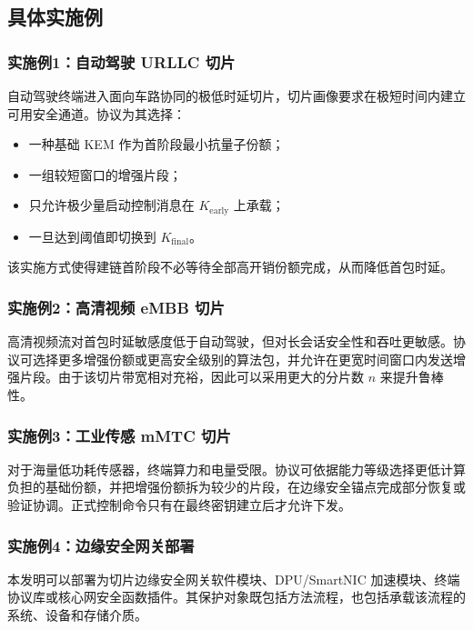 \documentclass[12pt,a4paper]{article}
\newcommand{\Kearly}{K_{\mathrm{early}}}
\newcommand{\Kfinal}{K_{\mathrm{final}}}
\begin{document}
\subsection{具体实施例}

\subsubsection*{实施例1：自动驾驶 URLLC 切片}

自动驾驶终端进入面向车路协同的极低时延切片，切片画像要求在极短时间内建立可用安全通道。协议为其选择：

\begin{itemize}[leftmargin=2em]
    \item 一种基础 KEM 作为首阶段最小抗量子份额；
    \item 一组较短窗口的增强片段；
    \item 只允许极少量启动控制消息在 $\Kearly$ 上承载；
    \item 一旦达到阈值即切换到 $\Kfinal$。
\end{itemize}

该实施方式使得建链首阶段不必等待全部高开销份额完成，从而降低首包时延。

\subsubsection*{实施例2：高清视频 eMBB 切片}

高清视频流对首包时延敏感度低于自动驾驶，但对长会话安全性和吞吐更敏感。协议可选择更多增强份额或更高安全级别的算法包，并允许在更宽时间窗口内发送增强片段。由于该切片带宽相对充裕，因此可以采用更大的分片数 $n$ 来提升鲁棒性。

\subsubsection*{实施例3：工业传感 mMTC 切片}

对于海量低功耗传感器，终端算力和电量受限。协议可依据能力等级选择更低计算负担的基础份额，并把增强份额拆为较少的片段，在边缘安全锚点完成部分恢复或验证协调。正式控制命令只有在最终密钥建立后才允许下发。

\subsubsection*{实施例4：边缘安全网关部署}

本发明可以部署为切片边缘安全网关软件模块、DPU/SmartNIC 加速模块、终端协议库或核心网安全函数插件。其保护对象既包括方法流程，也包括承载该流程的系统、设备和存储介质。
\end{document}
